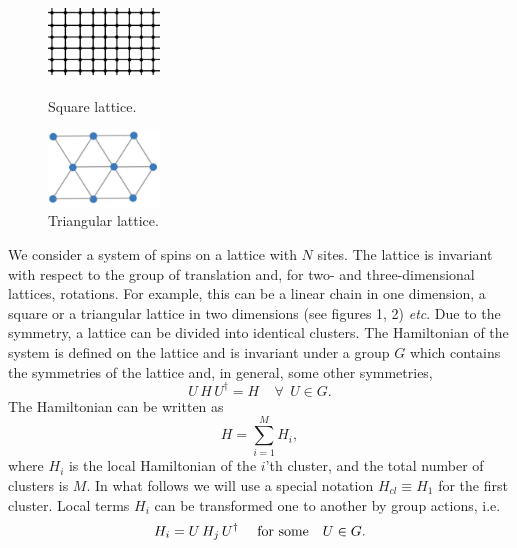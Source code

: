 \documentclass[a4paper]{jpconf}
\renewcommand\[{\begin{equation}}
\renewcommand\]{\end{equation}}
\newcommand{\be}{\begin{equation}}
\newcommand{\ee}{\end{equation}}
\begin{document}
\begin{figure}[t]
	\begin{minipage}{7pc}
		\includegraphics[width=7pc]{sqlattice.png}
	\end{minipage}\hspace{2pc}%
	\begin{minipage}{7pc}
		\caption{\label{label} Square lattice.}
	\end{minipage}\hspace{2pc}%
	\begin{minipage}{7pc}
		\includegraphics[width=7pc]{triangle-lattice.png}
	\end{minipage}\hspace{2pc}%
	\begin{minipage}{7pc}
		\caption{\label{label} Triangular  lattice.}
	\end{minipage}
\end{figure}
We consider a system of spins on a lattice with $N$ sites. The lattice is invariant with respect to the group of translation and, for two- and three-dimensional lattices, rotations. For example, this can be a linear chain in one dimension, a square or a triangular lattice in two dimensions (see figures 1, 2) {\it etc}.  Due to the symmetry, a lattice can be divided into identical clusters. The Hamiltonian of the system is defined on the lattice and is invariant under a group $G$ which contains the symmetries of the lattice and, in general, some other symmetries,
\be
U\,H\,U^\dagger =H~~~~~\forall ~~U\in G.
\ee
The Hamiltonian  can be written as
\be\label{H}
H=\sum_{i=1}^M H_i,
\ee
where $H_i$ is the local Hamiltonian of the $i$'th cluster, and the total number of clusters is $M$. In what follows we will use a special notation $H_{cl}\equiv H_1$ for the first cluster. Local terms $H_i$ can be transformed one to another by group actions, i.e.
\be\label{Hi}
H_i=U\,H_j\,U^\dagger~~~~{\rm for~ some}~~~U\in G.
\ee
\end{document}
